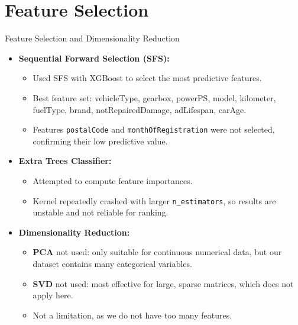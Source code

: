 \documentclass{beamer}
\begin{document}
\section{Feature Selection}
\begin{frame}{Feature Selection and Dimensionality Reduction}
    \begin{itemize}
        \item \textbf{Sequential Forward Selection (SFS):}
        \begin{itemize}
            \item Used SFS with XGBoost to select the most predictive features.
            \item Best feature set: vehicleType, gearbox, powerPS, model, kilometer, fuelType, brand, notRepairedDamage, adLifespan, carAge.
            \item Features \texttt{postalCode} and \texttt{monthOfRegistration} were not selected, confirming their low predictive value.
        \end{itemize}
        \item \textbf{Extra Trees Classifier:}
        \begin{itemize}
            \item Attempted to compute feature importances.
            \item Kernel repeatedly crashed with larger \texttt{n\_estimators}, so results are unstable and not reliable for ranking.
        \end{itemize}
        \item \textbf{Dimensionality Reduction:}
        \begin{itemize}
            \item \textbf{PCA} not used: only suitable for continuous numerical data, but our dataset contains many categorical variables.
            \item \textbf{SVD} not used: most effective for large, sparse matrices, which does not apply here.
            \item Not a limitation, as we do not have too many features.
        \end{itemize}
    \end{itemize}
\end{frame}
\end{document}
